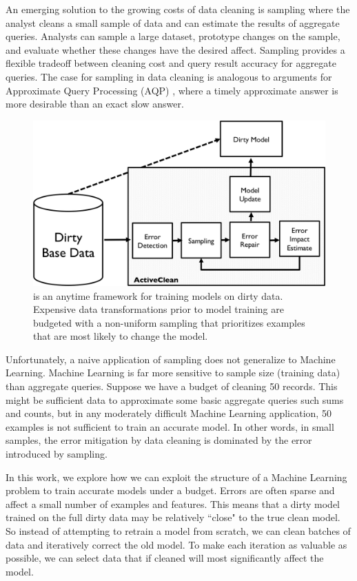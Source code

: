 An emerging solution to the growing costs of data cleaning is sampling \cite{wang1999sample} where the analyst cleans a small sample of data and can estimate the results of aggregate queries.
Analysts can sample a large dataset, prototype changes on the sample, and evaluate whether these changes have the desired affect.
Sampling provides a flexible tradeoff between cleaning cost and query result accuracy for aggregate queries.
The case for sampling in data cleaning is analogous to arguments for Approximate Query Processing (AQP) \cite{DBLP:conf/eurosys/AgarwalMPMMS13}, where a timely approximate answer is more desirable than an exact slow answer. 

\begin{figure}[t]
\centering
 \includegraphics[width=\columnwidth]{figs/arch.png}
 \caption{\sysfull is an anytime framework for training models on dirty data. Expensive data transformations prior to model training are budgeted with a non-uniform sampling that prioritizes examples that are most likely to change the model.  \label{sys-arch}}
\end{figure}

Unfortunately, a naive application of sampling does not generalize to Machine Learning.
Machine Learning is far more sensitive to sample size (training data) than aggregate queries.
Suppose we have a budget of cleaning 50 records.
This might be sufficient data to approximate some basic aggregate queries such sums and counts, but in any moderately difficult Machine Learning application, 50 examples is not sufficient to train an accurate model.
In other words, in small samples, the error mitigation by data cleaning is dominated by the error introduced by sampling.

In this work, we explore how we can exploit the structure of a Machine Learning problem to train accurate models under a budget.
Errors are often sparse and affect a small number of examples and features.
This means that a dirty model trained on the full dirty data may be relatively ``close" to the true clean model.
So instead of attempting to retrain a model from scratch, we can clean batches of data and iteratively correct the old model.
To make each iteration as valuable as possible, we can select data that if cleaned will most significantly affect the model.

